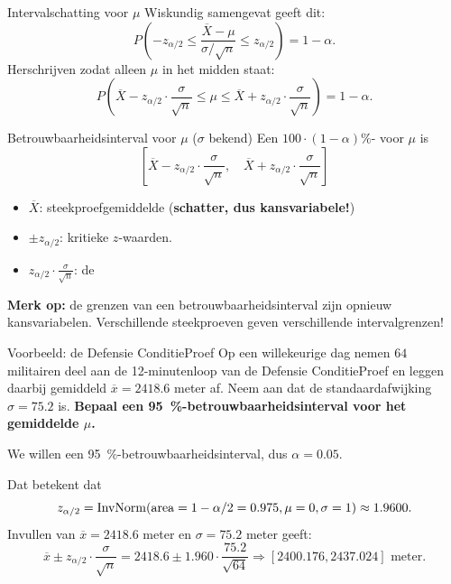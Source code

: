     \begin{frame}{Intervalschatting voor $\mu$}
        Wiskundig samengevat geeft dit:
        \[
            P\left(-z_{\alpha/2} \leq \frac{\overline{X} - \mu}{\sigma / \sqrt{n}} \leq z_{\alpha/2}\right) = 1 - \alpha.
        \]
        \vfill\pause
        Herschrijven zodat alleen $\mu$ in het midden staat:
        \[
            P\left(\overline{X} - z_{\alpha/2}\cdot\frac{\sigma}{\sqrt{n}} \leq \mu \leq \overline{X} + z_{\alpha/2}\cdot\frac{\sigma}{\sqrt{n}}\right) = 1 - \alpha.
        \]
    \end{frame}

    \begin{frame}{Betrouwbaarheidsinterval voor $\mu$ ($\sigma$ bekend)}
        Een $100 \cdot (1-\alpha) \%$- voor $\mu$ is
        \[
            \left[\overline{X} - z_{\alpha/2} \cdot \frac{\sigma}{\sqrt{n}}, \quad \overline{X} + z_{\alpha/2} \cdot \frac{\sigma}{\sqrt{n}}\right]
        \]
        \vfill
        \begin{itemize}
            \item $\overline{X}$: steekproefgemiddelde (\textbf{schatter, dus kansvariabele!})
            \item $\pm z_{\alpha/2}$: kritieke $z$-waarden.
            \item $z_{\alpha/2} \cdot \frac{\sigma}{\sqrt{n}}$: de 
        \end{itemize}
        \vfill\pause
        \textbf{Merk op:} de grenzen van een betrouwbaarheidsinterval zijn opnieuw kansvariabelen.
        Verschillende steekproeven geven verschillende intervalgrenzen!
    \end{frame}

    \begin{frame}{Voorbeeld: de Defensie ConditieProef}
        Op een willekeurige dag nemen $64$ militairen deel aan de 12-minutenloop van de Defensie ConditieProef
        en leggen daarbij gemiddeld $\overline{x}=2418.6$ meter af.
        Neem aan dat de standaardafwijking $\sigma = 75.2$ is.
        \vfill
        \textbf{Bepaal een \SI{95}{\percent}-betrouwbaarheidsinterval voor het gemiddelde $\mu$.}
        \pause\vfill
        {\color{highlightcolor}
        We willen een \SI{95}{\percent}-betrouwbaarheidsinterval, dus $\alpha = 0.05$.

        Dat betekent dat
        \[
            z_{\alpha/2} = \operatorname{InvNorm}(\text{area}=1-\alpha/2=0.975, \mu=0, \sigma=1) \approx 1.9600.
        \]
        Invullen van $\overline{x}=2418.6$ meter en $\sigma=75.2$ meter geeft:
        \[
            \overline{x} \pm z_{\alpha/2} \cdot \frac{\sigma}{\sqrt{n}} = 2418.6 \pm 1.960 \cdot \frac{75.2}{\sqrt{64}} \Rightarrow [2400.176, 2437.024] \text{ meter.}
        \]}
    \end{frame}


